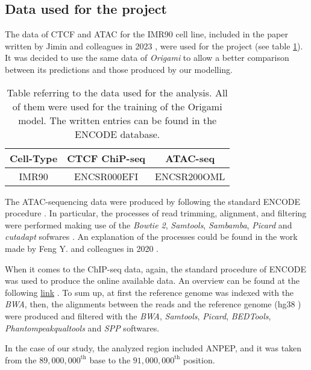 \subsection{Data used for the project} \label{methods: data used}
The data of CTCF and ATAC for the IMR90 cell line, included in the paper written by Jimin and colleagues in 2023
\cite{tanCelltypespecificPrediction3D2023},
were used for the project (see table \ref{tab:data}). It was decided to use the same data of \textit{Origami} to allow a better comparison between its predictions and those produced by our modelling.

\begin{table}[H]
    \centering
    \begin{tabular}{|c|c|c|}
        \hline
        \textbf{Cell-Type} & \textbf{CTCF ChiP-seq} & \textbf{ATAC-seq}\\
        \hline
        IMR90 & ENCSR000EFI & ENCSR200OML\\
        \hline
    \end{tabular}
    \caption{Table referring to the data used for the analysis. All of them were used for the training of the Origami\cite{tanCelltypespecificPrediction3D2023} model. The written entries can be found in the ENCODE database\cite{encodeprojectconsortiumIntegratedEncyclopediaDNA2012}.}
    \label{tab:data}
\end{table}

The ATAC-sequencing data were produced by following the standard ENCODE procedure
\cite{ATACseqUnreplicatedENCODE}. 
In particular, the processes of read trimming, alignment, and filtering were performed making use of the \textit{Bowtie 2}, \textit{Samtools}, \textit{Sambamba}, \textit{Picard} and \textit{cutadapt} sofwares
\cite{j.michaelcherryATACSeqPipeline}. 
An explanation of the processes could be found in the work made by Feng Y. and colleagues in 2020
\cite{yanReadsInsightHitchhiker2020}.

When it comes to the ChIP-seq data, again, the standard procedure of ENCODE was used to produce the online available data. An overview can be found at the following \href{https://www.encodeproject.org/chip-seq/transcription_factor/}{link}
\cite{TranscriptionFactorChIPseq}.
To sum up, at first the reference genome was indexed with the \textit{BWA}, then, the alignments between the reads and the reference genome (hg38
\cite{HomoSapiensGenome})
were produced and filtered with the \textit{BWA}, \textit{Samtools}, \textit{Picard}, \textit{BEDTools}, \textit{Phantompeakqualtools} and \textit{SPP} softwares.


In the case of our study, the analyzed region included ANPEP, and it was taken from the $89,000,000^{\text{th}}$ base to the $91,000,000^{\text{th}}$ position.
